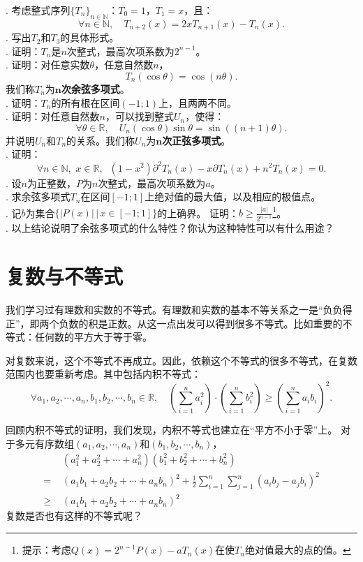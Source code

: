 \documentclass[12pt,UTF8]{ctexbook}
\begin{document}
\begin{appendix}
\begin{xt}
    . 考虑整式序列$\{T_n\}_{n\in\mathbb{N}}$：$T_0 = 1$，$T_1 = x$，且：
    $$ \forall n\in\mathbb{N}, \quad T_{n+2}(x) = 2xT_{n+1}(x) - T_n(x).$$
    . 写出$T_2$和$T_3$的具体形式。\\
    . 证明：$T_n$是$n$次整式，最高次项系数为$2^{n-1}$。\\
    . 证明：对任意实数$\theta$，任意自然数$n$，
    $$ T_n(\cos{\theta}) = \cos{(n\theta)}.$$
    我们称$T_n$为$\boldsymbol{n}$\textbf{次余弦多项式}。\\
    . 证明：$T_n$的所有根在区间$(-1;1)$上，且两两不同。\\
    . 证明：对任意自然数$n$，可以找到整式$U_n$，使得：
    $$ \forall \theta \in \mathbb{R}, \quad U_n(\cos{\theta}) \sin{\theta} = \sin{((n+1)\theta)}. $$
    并说明$U_n$和$T_n$的关系。我们称$U_n$为$\boldsymbol{n}$\textbf{次正弦多项式}。\\
    . 证明：
    $$ \forall n\in\mathbb{N},\,\, x\in\mathbb{R}, \;\; (1 - x^2)\partial^2 T_n(x) - x\partial T_n(x) + n^2 T_n(x) = 0.$$
    . 设$n$为正整数，$P$为$n$次整式，最高次项系数为$a$。\\
    . 求余弦多项式$T_n$在区间$[-1;1]$上绝对值的最大值，以及相应的极值点。\\
    . 记$b$为集合$\{|P(x)| \, | \, x\in[-1;1]\}$的上确界。
    证明：$b \geqslant \frac{|a|}{2^{n-1}}$\footnote{提示：考虑$Q(x) = 2^{n-1}P(x) - aT_n(x)$在使$T_n$绝对值最大的点的值。}。\\
    . 以上结论说明了余弦多项式的什么特性？你认为这种特性可以有什么用途？
\end{xt}

\section{复数与不等式}

我们学习过有理数和实数的不等式。有理数和实数的基本不等关系之一是“负负得正”，即两个负数的积是正数。从这一点出发可以得到很多不等式。比如重要的不等式：任何数的平方大于等于零。

对复数来说，这个不等式不再成立。因此，依赖这个不等式的很多不等式，在复数范围内也要重新考虑。其中包括内积不等式：
$$ \forall a_1, a_2, \cdots, a_n, b_1, b_2, \cdots, b_n \in \mathbb{R}, \quad \left(\sum_{i=1}^n a_i^2\right)\cdot\left(\sum_{i=1}^n b_i^2\right)\geqslant \left(\sum_{i=1}^n a_ib_i\right)^2.$$

回顾内积不等式的证明，我们发现，内积不等式也建立在“平方不小于零”上。
对于多元有序数组$(a_1, a_2, \cdots, a_n)$和$(b_1, b_2, \cdots, b_n)$，
\begin{align*}
    &(a_1^2 + a_2^2 + \cdots + a_n^2)(b_1^2 + b_2^2 + \cdots + b_n^2)  \\
    =\,\,& (a_1b_1 + a_2b_2 + \cdots + a_nb_n)^2 + \frac{1}{2}\sum_{i=1}^n\sum_{j=1}^n(a_ib_j - a_jb_i)^2  \\
    \geqslant\,\,& (a_1b_1 + a_2b_2 + \cdots + a_nb_n)^2  
\end{align*}
复数是否也有这样的不等式呢？


\end{appendix}
\end{document}
